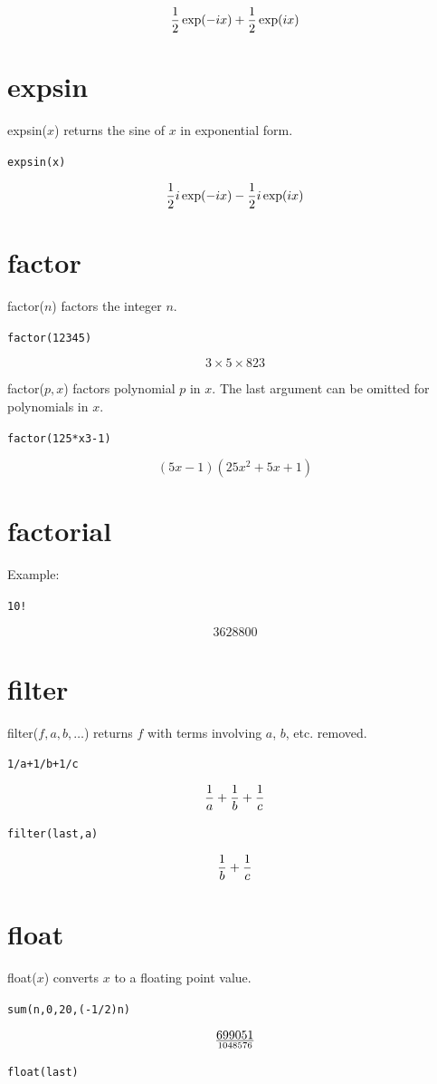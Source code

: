 \documentclass[12pt]{book}
\begin{document}
$${1\over2}\exp(-ix)+{1\over2}\exp(ix)$$

\section*{expsin}
expsin($x$) returns the sine of $x$ in exponential form.

\medskip
{\tt expsin(x)}

$${1\over2}i\exp(-ix)-{1\over2}i\exp(ix)$$

\section*{factor}
factor($n$) factors the integer $n$.

\medskip
{\tt factor(12345)}

$$3\times 5\times 823$$

\medskip
\noindent
factor($p,x$) factors polynomial $p$ in $x$.
The last argument can be omitted for polynomials in $x$.

\medskip
{\tt factor(125*x{}3-1)}

$$(5x-1)(25x^2+5x+1)$$

\section*{factorial}
Example:

\medskip
{\tt 10!}

$$3628800$$

\section*{filter}
filter($f,a,b,\ldots$) returns $f$ with terms involving $a$, $b$, etc. removed.

\medskip
{\tt 1/a+1/b+1/c}

$${1\over a}+{1\over b}+{1\over c}$$

{\tt filter(last,a)}

$${1\over b}+{1\over c}$$

\section*{float}
float($x$) converts $x$ to a floating point value.

\medskip
{\tt sum(n,0,20,(-1/2){}n)}

$$699051\over1048576$$

{\tt float(last)}
\end{document}
